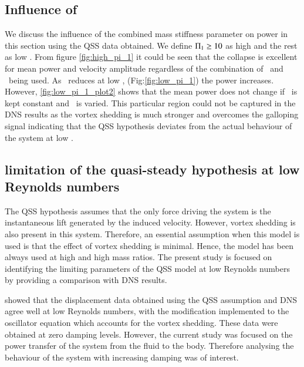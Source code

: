  \subsection{Influence of \ \massstiff}
 
 
 
 
 
 
We discuss the influence of the combined mass stiffness parameter on power in this section using the QSS data obtained. We define $\Pi_1 \geq 10$ as high \massstiff and the rest as low \massstiff. From figure \ref{fig:high_pi_1} it could be seen that the collapse is excellent for mean power and velocity amplitude regardless of the combination of \ustar \ and \ \mstar being used. As \massstiff \ reduces at low \massstiff, (Fig:\ref{fig:low_pi_1}) the power increases. However, \ref{fig:low_pi_1_plot2} shows that the mean power does not change if \massstiff \ is kept constant and \mstar \ is varied. This particular region could not be captured in the DNS results as the vortex shedding is much stronger and overcomes the galloping signal indicating that the QSS hypothesis deviates from the actual behaviour of the system at low \massstiff.
 
 
\subsection{limitation of the quasi-steady hypothesis at low Reynolds numbers}



The QSS hypothesis assumes that the only force driving the system is the instantaneous lift generated by the induced velocity. However, vortex shedding is also present in this system. Therefore, an essential assumption when this model is used is that the effect of vortex shedding is minimal. Hence, the model has been always used at high \reynoldsnumber and high mass ratios. The present study is focused on identifying the limiting parameters of the QSS model at low Reynolds numbers by providing a comparison with DNS results. 


\citet{Joly2012} showed that the displacement data obtained using the QSS assumption and DNS agree well at low Reynolds numbers, with the modification implemented to the oscillator equation which accounts for the vortex shedding. These data were obtained at zero damping levels. However, the current study was focused on the power transfer of the system from the fluid to the body. Therefore analysing the behaviour of the system with increasing damping was of interest.

